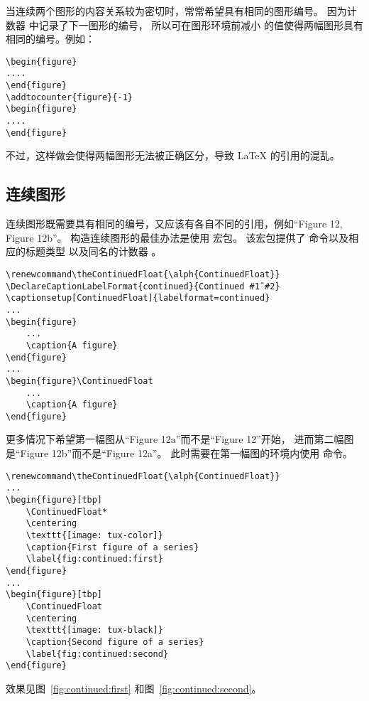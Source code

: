 当连续两个图形的内容关系较为密切时，常常希望具有相同的图形编号。
因为计数器  中记录了下一图形的编号，
所以可在图形环境前减小  的值使得两幅图形具有相同的编号。例如：
\begin{lstlisting}
\begin{figure}
....
\end{figure}
\addtocounter{figure}{-1}
\begin{figure}
....
\end{figure}
\end{lstlisting}
不过，这样做会使得两幅图形无法被正确区分，导致 \LaTeX{} 的引用的混乱。

\subsection{连续图形}\label{ssec:continuedfloat}

连续图形既需要具有相同的编号，又应该有各自不同的引用，例如“Figure 12, Figure 12b”。
构造连续图形的最佳办法是使用  宏包。
该宏包提供了  命令以及相应的标题类型  以及同名的计数器 。
\begin{lstlisting}
\renewcommand\theContinuedFloat{\alph{ContinuedFloat}}
\DeclareCaptionLabelFormat{continued}{Continued #1˜#2}
\captionsetup[ContinuedFloat]{labelformat=continued}
...
\begin{figure}
	...
	\caption{A figure}
\end{figure}
...
\begin{figure}\ContinuedFloat
	...
	\caption{A figure}
\end{figure}
\end{lstlisting}

更多情况下希望第一幅图从“Figure 12a”而不是“Figure 12”开始，
进而第二幅图是“Figure 12b”而不是“Figure 12a”。
此时需要在第一幅图的环境内使用  命令。
\begin{lstlisting}
\renewcommand\theContinuedFloat{\alph{ContinuedFloat}}
...
\begin{figure}[tbp]
	\ContinuedFloat*
	\centering
	\texttt{[image: tux-color]}
	\caption{First figure of a series}
	\label{fig:continued:first}
\end{figure}
...
\begin{figure}[tbp]
	\ContinuedFloat
	\centering
	\texttt{[image: tux-black]}
	\caption{Second figure of a series}
	\label{fig:continued:second}
\end{figure}
\end{lstlisting}
效果见图~\ref{fig:continued:first} 和图~\ref{fig:continued:second}。

